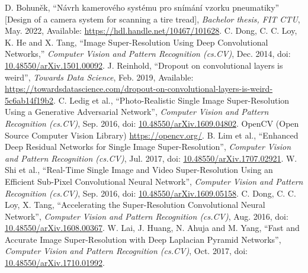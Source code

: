 \documentclass[english]{mvi-report}
\begin{document}
\begin{thebibliography}{9}
 D. Bohuněk, ``Návrh kamerového systému pro snímání vzorku pneumatiky'' [Design of a camera system for scanning a tire tread], \textit{Bachelor thesis, FIT CTU}, May. 2022, Available: \url{https://hdl.handle.net/10467/101628}.
 C. Dong, C. C. Loy, K. He and X. Tang, ``Image Super-Resolution Using Deep Convolutional Networks,'' \textit{Computer Vision and Pattern Recognition (cs.CV)}, Dec. 2014, doi: \href{https://doi.org/10.48550/arXiv.1501.00092}{10.48550/arXiv.1501.00092}.
 J. Reinhold, ``Dropout on convolutional layers is weird'', \textit{Towards Data Science}, Feb. 2019, Available: \url{https://towardsdatascience.com/dropout-on-convolutional-layers-is-weird-5c6ab14f19b2}.
 C. Ledig et al., ``Photo-Realistic Single Image Super-Resolution Using a Generative Adversarial Network'', \textit{Computer Vision and Pattern Recognition (cs.CV)}, Sep. 2016, doi: \href{https://doi.org/10.48550/arXiv.1609.04802}{10.48550/arXiv.1609.04802}.
 OpenCV (Open Source Computer Vision Library) \url{https://opencv.org/}.
 B. Lim et al., ``Enhanced Deep Residual Networks for Single Image Super-Resolution'', \textit{Computer Vision and Pattern Recognition (cs.CV)}, Jul. 2017, doi: \href{https://doi.org/10.48550/arXiv.1707.02921}{10.48550/arXiv.1707.02921}.
 W. Shi et al., ``Real-Time Single Image and Video Super-Resolution Using an Efficient Sub-Pixel Convolutional Neural Network'', \textit{Computer Vision and Pattern Recognition (cs.CV)}, Sep. 2016, doi: \href{https://doi.org/10.48550/arXiv.1609.05158}{10.48550/arXiv.1609.05158}.
 C. Dong, C. C. Loy, X. Tang, ``Accelerating the Super-Resolution Convolutional Neural Network'', \textit{Computer Vision and Pattern Recognition (cs.CV)}, Aug. 2016, doi: \href{https://doi.org/10.48550/arXiv.1608.00367}{10.48550/arXiv.1608.00367}.
 W. Lai, J. Huang, N. Ahuja and M. Yang, ``Fast and Accurate Image Super-Resolution with Deep Laplacian Pyramid Networks'', \textit{Computer Vision and Pattern Recognition (cs.CV)}, Oct. 2017, doi: \href{https://doi.org/10.48550/arXiv.1710.01992}{10.48550/arXiv.1710.01992}.
\end{thebibliography}
\end{document}
